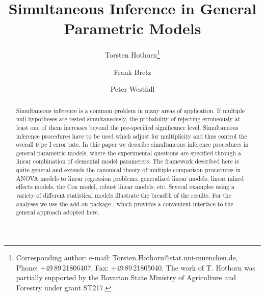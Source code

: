 \documentclass[bimj,fleqn]{w-art}
\begin{document}
\newcommand{\url}[1]{\texttt{#1}}





\title[Simultaneous Inference]{Simultaneous Inference in General Parametric Models}

\author[Torsten Hothorn]{Torsten Hothorn\footnote{Corresponding
     author: e-mail: {\sf Torsten.Hothorn@stat.uni-muenchen.de}, Phone: +49\,89\,21806407,
     Fax: +49\,89\,21805040.
The work of T. Hothorn was partially supported by the 
Bavarian State Ministry of Agriculture and Forestry under
grant ST217.}
} \address[\inst{1}]{
Institut f{\"u}r Statistik \\ Ludwig-Maximilians-Universit{\"a}t M{\"u}nchen \\
Ludwigstra{\ss }e 33, D--80539 M{\"u}nchen, Germany}

\author[Frank Bretz]{Frank Bretz }
\address[\inst{2}]{Statistical Methodology, Clinical Information Sciences, 
Novartis Pharma AG  \\ CH-4002 Basel, Switzerland}

\author[Peter Westfall]{Peter Westfall }
\address[\inst{3}]{Texas Tech University, Lubbock, TX 79409, U.S.A}

\begin{abstract}
Simultaneous inference is a common problem in many areas of application. If
multiple null hypotheses are tested simultaneously, the probability of
rejecting erroneously at least one of them increases beyond the
pre-specified significance level. Simultaneous inference procedures have to
be used which adjust for multiplicity and thus control the overall type I
error rate. In this paper we describe simultaneous inference procedures in
general parametric models, where the experimental questions are specified
through a linear combination of elemental model parameters. The framework
described here is quite general and extends the canonical theory of multiple
comparison procedures in ANOVA models to linear regression problems,
generalized linear models, linear mixed effects models, the Cox model,
robust linear models, etc. Several examples using a variety of different
statistical models illustrate the breadth of the results. For the analyses
we use the \RR{} add-on package , which provides a
convenient interface to the general approach adopted here.
\end{abstract}
\end{document}

